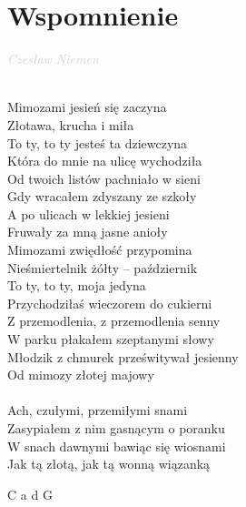 \documentclass[a5paper, 10pt]{book}
\begin{document}
\newpage
\section{Wspomnienie}\textcolor{lightgray}{\textit{Czesław Niemen}}\\~\\
\begin{minipage}[t]{0.8\textwidth}
Mimozami jesień się zaczyna\\
Złotawa, krucha i miła\\
To ty, to ty jesteś ta dziewczyna\\
Która do mnie na ulicę wychodziła\\
\hspace*{5mm}Od twoich listów pachniało w sieni\\
\hspace*{5mm}Gdy wracałem zdyszany ze szkoły\\
\hspace*{5mm}A po ulicach w lekkiej jesieni\\
\hspace*{5mm}Fruwały za mną jasne anioły\\

Mimozami zwiędłość przypomina\\
Nieśmiertelnik żółty – październik\\
To ty, to ty, moja jedyna\\
Przychodziłaś wieczorem do cukierni\\
\hspace*{5mm}Z przemodlenia, z przemodlenia senny\\
\hspace*{5mm}W parku płakałem szeptanymi słowy\\
\hspace*{5mm}Młodzik z chmurek prześwitywał jesienny\\
\hspace*{5mm}Od mimozy złotej majowy\\
\\
Ach, czułymi, przemiłymi snami\\
Zasypiałem z nim gasnącym o poranku\\
W snach dawnymi bawiąc się wiosnami\\
Jak tą złotą, jak tą wonną wiązanką\\
\end{minipage}
\begin{minipage}[t]{0.2\textwidth}
C a d G\\
\end{minipage}
\end{document}
